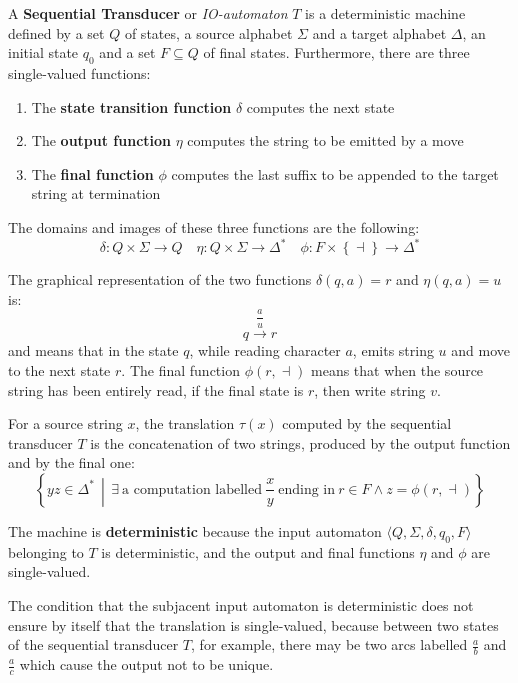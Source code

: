 \documentclass[english]{article}
\begin{document}
\begin{definition}
  \label{def:sequential-transducer}
  A \textbf{Sequential Transducer} or \textit{IO-automaton} \(T\) is a deterministic machine defined by a set \(Q\) of states, a source alphabet \(\Sigma\) and a target alphabet \(\Delta\), an initial state \(q_0\) and a set \(F \subseteq Q\) of final states.
  Furthermore, there are three single-valued functions:

  \begin{enumerate}
    \item The \textbf{state transition function} \(\delta\) computes the next state
    \item The \textbf{output function} \(\eta\) computes the string to be emitted by a move
    \item The \textbf{final function} \(\phi\) computes the last suffix to be appended to the target string at termination
  \end{enumerate}

  The domains and images of these three functions are the following:
  \[ \delta: Q \times \Sigma \rightarrow Q \quad \eta: Q \times \Sigma \rightarrow \Delta^\ast \quad \phi : F \times \left\{ \dashv \right\} \rightarrow \Delta^\ast \]
\end{definition}

The graphical representation of the two functions \(\delta(q, a) = r\) and \(\eta(q, a) = u\) is:
\[ q \xrightarrow{\dfrac{a}{u}} r \]
and means that in the state \(q\), while reading character \(a\), emits string \(u\) and move to the next state \(r\).
The final function \(\phi(r, \dashv)\) means that when the source string has been entirely read, if the final state is \(r\), then write string \(v\).

For a source string \(x\), the translation \(\tau(x)\) computed by the sequential transducer \(T\) is the concatenation of two strings, produced by the output function and by the final one:
\[ \left\{ yz \in \Delta^\ast \, \middle\vert \, \exists \ \text{a computation labelled} \ \dfrac{x}{y} \ \text{ending in} \ r \in F \land z = \phi\left( r, \dashv \right) \right\} \]

\bigskip
The machine is \textbf{deterministic} because the input automaton \(\langle Q, \Sigma, \delta, q_0, F \rangle\) belonging to \(T\) is deterministic, and the output and final functions \(\eta\) and \(\phi\) are single-valued.

The condition that the subjacent input automaton is deterministic does not ensure by itself that the translation is single-valued, because between two states of the sequential transducer \(T\), for example, there may be two arcs labelled \(\frac{a}{b}\) and \(\frac{a}{c}\) which cause the output not to be unique.
\end{document}
